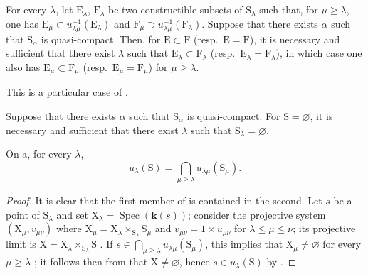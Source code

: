 \begin{corollary}[8.3.5]
\label{IV.8.3.5}
For every $\lambda$, let $\mathrm{E}_\lambda$, $\mathrm{F}_\lambda$ be two constructible subsets of $\mathrm{S}_\lambda$ such that, for $\mu\geqslant\lambda$, one has $\mathrm{E}_\mu\subset u_{\lambda\mu}^{-1}(\mathrm{E}_\lambda)$ and $\mathrm{F}_\mu\supset u_{\lambda\mu}^{-1}(\mathrm{F}_\lambda)$.
Suppose that there exists $\alpha$ such that $\mathrm{S}_\alpha$ is quasi-compact.
Then, for $\mathrm{E}\subset\mathrm{F}$ \textnormal{(}resp.\ $\mathrm{E}=\mathrm{F}$\textnormal{)}, it is necessary and sufficient that there exist $\lambda$ such that $\mathrm{E}_\lambda\subset\mathrm{F}_\lambda$ \textnormal{(}resp.\ $\mathrm{E}_\lambda=\mathrm{F}_\lambda$\textnormal{)}, in which case one also has $\mathrm{E}_\mu\subset\mathrm{F}_\mu$ \textnormal{(}resp.\ $\mathrm{E}_\mu=\mathrm{F}_\mu$\textnormal{)} for $\mu\geqslant\lambda$.

This is a particular case of .
\end{corollary}

\begin{corollary}[8.3.6]
\label{IV.8.3.6}
Suppose that there exists $\alpha$ such that $\mathrm{S}_\alpha$ is quasi-compact.
For $\mathrm{S}=\varnothing$, it is necessary and sufficient that there exist $\lambda$ such that $\mathrm{S}_\lambda=\varnothing$.
\end{corollary}

\begin{corollary}[8.3.7]
\label{IV.8.3.7}
On a, for every $\lambda$,
\begin{equation}
  u_\lambda(\mathrm{S})=\bigcap_{\mu\geqslant\lambda}u_{\lambda\mu}(\mathrm{S}_\mu).
  \tag{8.3.7.1}
\end{equation}
\end{corollary}

\begin{proof}
It is clear that the first member of  is contained in the second.
Let $s$ be a point of $\mathrm{S}_\lambda$ and set $\mathrm{X}_\lambda=\operatorname{Spec}(\boldsymbol{k}(s))$; consider the projective system $(\mathrm{X}_\mu,v_{\mu\nu})$ where $\mathrm{X}_\mu=\mathrm{X}_\lambda\times_{\mathrm{S}_\lambda}\mathrm{S}_\mu$ and $v_{\mu\nu}=1\times u_{\mu\nu}$ for $\lambda\leqslant\mu\leqslant\nu$; its projective limit is $\mathrm{X}=\mathrm{X}_\lambda\times_{\mathrm{S}_\lambda}\mathrm{S}$ .
If $s\in\bigcap_{\mu\geqslant\lambda}u_{\lambda\mu}(\mathrm{S}_\mu)$, this implies that $\mathrm{X}_\mu\neq\varnothing$ for every $\mu\geqslant\lambda$ ; it follows then from  that $\mathrm{X}\neq\varnothing$, hence $s\in u_\lambda(\mathrm{S})$ by .
\end{proof}

